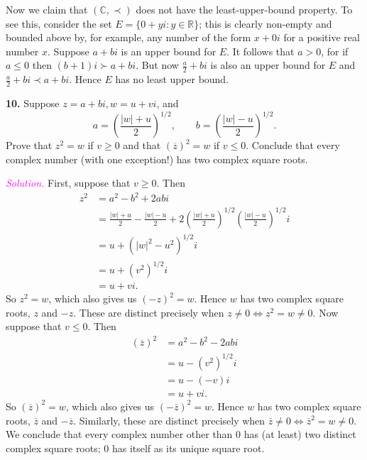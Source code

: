 \documentclass[12pt]{article}
\newcommand{\newp}{\vspace{5mm}}
\theoremstyle{definition}
\begin{document}
\newp

Now we claim that \( (\mathbb{C}, \prec) \) does not have the least-upper-bound property. To see this, consider the set \( E = \{ 0 + yi : y \in \mathbb{R} \} \); this is clearly non-empty and bounded above by, for example, any number of the form \( x + 0i \) for a positive real number \( x \). Suppose \( a + bi \) is an upper bound for \( E \). It follows that \( a > 0 \), for if \( a \leq 0 \) then \( (b + 1)i \succ a + bi \). But now \( \frac{a}{2} + bi \) is also an upper bound for \( E \) and \( \frac{a}{2} + bi \prec a + bi \). Hence \( E \) has no least upper bound.

\newp

\textbf{10.} Suppose \( z = a + bi, w = u + vi \), and
\[
a = \left( \frac{|w| + u}{2} \right)^{1/2}, \qquad b = \left( \frac{|w| - u}{2} \right)^{1/2}.
\]
Prove that \( z^2 = w \) if \( v \geq 0 \) and that \( (\overline{z})^2 = w \) if \( v \leq 0 \). Conclude that every complex number (with one exception!) has two complex square roots.

\newp

\textit{\textcolor{magenta}{Solution.}} First, suppose that \( v \geq 0 \). Then
\begin{align*}
z^2 &= a^2 - b^2 + 2abi \\
&= \frac{|w| + u}{2} - \frac{|w| - u}{2} + 2 \left( \frac{|w| + u}{2} \right)^{1/2} \left( \frac{|w| - u}{2} \right)^{1/2} i \\
&= u + (|w|^2 - u^2)^{1/2} i \\
&= u + (v^2)^{1/2} i \\
&= u + vi.
\end{align*}
So \( z^2 = w \), which also gives us \( (-z)^2 = w \). Hence \( w \) has two complex square roots, \( z \) and \( -z \). These are distinct precisely when \( z \neq 0 \iff z^2 = w \neq 0 \). Now suppose that \( v \leq 0 \). Then
\begin{align*}
(\overline{z})^2 &= a^2 - b^2 - 2abi \\
&= u - (v^2)^{1/2} i \\
&= u - (-v)i \\
&= u + vi.
\end{align*}
So \( (\overline{z})^2 = w \), which also gives us \( (-\overline{z})^2 = w \). Hence \( w \) has two complex square roots, \( \overline{z} \) and \( -\overline{z} \). Similarly, these are distinct precisely when \( \overline{z} \neq 0 \iff \overline{z}^2 = w \neq 0 \). We conclude that every complex number other than 0 has (at least) two distinct complex square roots; 0 has itself as its unique square root.
\end{document}
